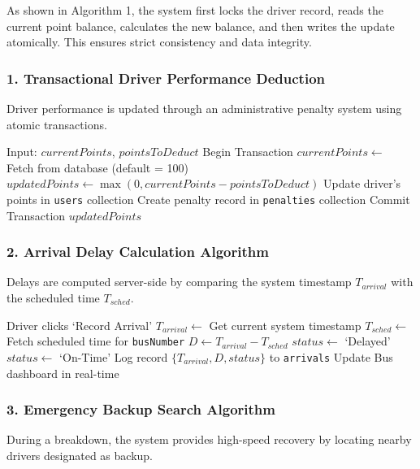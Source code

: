 \documentclass[conference]{IEEEtran}
\begin{document}
As shown in Algorithm 1, the system first locks the driver record, reads the current point balance, calculates the new balance, and then writes the update atomically. This ensures strict consistency and data integrity.

\subsubsection{1. Transactional Driver Performance Deduction}
Driver performance is updated through an administrative penalty system using atomic transactions.

\begin{algorithm}
\caption{Transactional Driver Performance Deduction}
\begin{algorithmic}[1]
\STATE Input: $currentPoints$, $pointsToDeduct$
\STATE Begin Transaction
\STATE $currentPoints \gets$ Fetch from database (default = 100)
\STATE $updatedPoints \gets \max(0, currentPoints - pointsToDeduct)$
\STATE Update driver's points in \texttt{users} collection
\STATE Create penalty record in \texttt{penalties} collection
\STATE Commit Transaction
\STATE \RETURN $updatedPoints$
\end{algorithmic}
\end{algorithm}

\subsubsection{2. Arrival Delay Calculation Algorithm}
Delays are computed server-side by comparing the system timestamp $T_{arrival}$ with the scheduled time $T_{sched}$.

\begin{algorithm}
\caption{One-Click Arrival Logging & Delay Calculation}
\begin{algorithmic}[1]
\STATE Driver clicks `Record Arrival'
\STATE $T_{arrival} \gets$ Get current system timestamp
\STATE $T_{sched} \gets$ Fetch scheduled time for \texttt{busNumber}
\STATE $D \gets T_{arrival} - T_{sched}$ 
    \STATE $status \gets$ `Delayed'
\ELSE
    \STATE $status \gets$ `On-Time'
\ENDIF
\STATE Log record $\{T_{arrival}, D, status\}$ to \texttt{arrivals}
\STATE Update Bus dashboard in real-time
\end{algorithmic}
\end{algorithm}

\vspace{0.5cm}

\subsubsection{3. Emergency Backup Search Algorithm}
During a breakdown, the system provides high-speed recovery by locating nearby drivers designated as backup.
\end{document}
